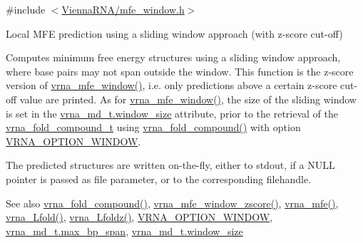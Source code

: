 {\ttfamily \#include $<$\mbox{\hyperlink{mfe__window_8h}{Vienna\+R\+N\+A/mfe\+\_\+window.\+h}}$>$}



Local M\+FE prediction using a sliding window approach (with z-\/score cut-\/off) 

Computes minimum free energy structures using a sliding window approach, where base pairs may not span outside the window. This function is the z-\/score version of \mbox{\hyperlink{group__mfe__window_ga689df235a1915a1ad56e377383c044ce}{vrna\+\_\+mfe\+\_\+window()}}, i.\+e. only predictions above a certain z-\/score cut-\/off value are printed. As for \mbox{\hyperlink{group__mfe__window_ga689df235a1915a1ad56e377383c044ce}{vrna\+\_\+mfe\+\_\+window()}}, the size of the sliding window is set in the \mbox{\hyperlink{group__model__details_abea42f9229f8d8d6bcbedef316315bfc}{vrna\+\_\+md\+\_\+t.\+window\+\_\+size}} attribute, prior to the retrieval of the \mbox{\hyperlink{group__fold__compound_ga1b0cef17fd40466cef5968eaeeff6166}{vrna\+\_\+fold\+\_\+compound\+\_\+t}} using \mbox{\hyperlink{group__fold__compound_ga6601d994ba32b11511b36f68b08403be}{vrna\+\_\+fold\+\_\+compound()}} with option \mbox{\hyperlink{group__fold__compound_ga2b2a8009ccdccc3eb1571556261aee8e}{V\+R\+N\+A\+\_\+\+O\+P\+T\+I\+O\+N\+\_\+\+W\+I\+N\+D\+OW}}.

The predicted structures are written on-\/the-\/fly, either to stdout, if a N\+U\+LL pointer is passed as file parameter, or to the corresponding filehandle.

\begin{DoxySeeAlso}{See also}
\mbox{\hyperlink{group__fold__compound_ga6601d994ba32b11511b36f68b08403be}{vrna\+\_\+fold\+\_\+compound()}}, \mbox{\hyperlink{group__mfe__window_gaa4f67ae94efd08d800c17f9b53423fd6}{vrna\+\_\+mfe\+\_\+window\+\_\+zscore()}}, \mbox{\hyperlink{group__mfe__global_gabd3b147371ccf25c577f88bbbaf159fd}{vrna\+\_\+mfe()}}, \mbox{\hyperlink{group__mfe__window_ga4918cce52bf69c1913cda503b2ac75d8}{vrna\+\_\+\+Lfold()}}, \mbox{\hyperlink{group__mfe__window_ga27fddda5fc63eb49c861e38845fc34b4}{vrna\+\_\+\+Lfoldz()}}, \mbox{\hyperlink{group__fold__compound_ga2b2a8009ccdccc3eb1571556261aee8e}{V\+R\+N\+A\+\_\+\+O\+P\+T\+I\+O\+N\+\_\+\+W\+I\+N\+D\+OW}}, \mbox{\hyperlink{group__model__details_a659e5fcc6e8c9f1a68e7de6548eef3b0}{vrna\+\_\+md\+\_\+t.\+max\+\_\+bp\+\_\+span}}, \mbox{\hyperlink{group__model__details_abea42f9229f8d8d6bcbedef316315bfc}{vrna\+\_\+md\+\_\+t.\+window\+\_\+size}}
\end{DoxySeeAlso}


